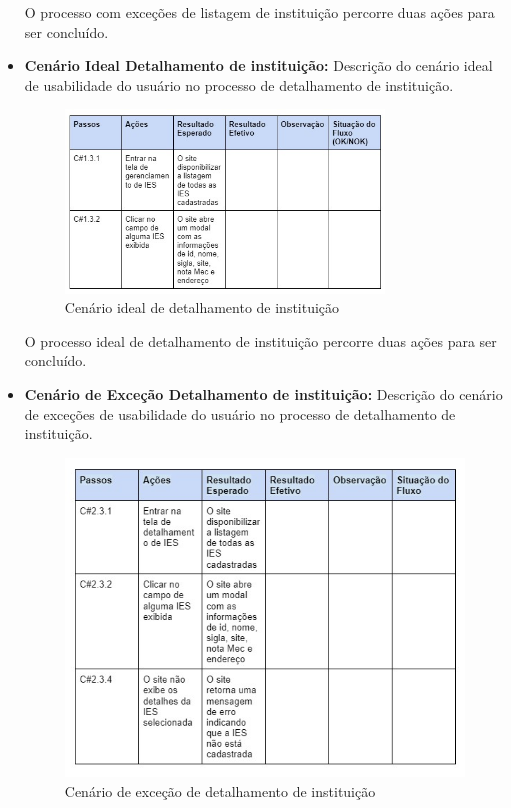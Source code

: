 \begin{itemize}
O processo com exceções de listagem de instituição percorre duas ações para ser concluído.

\newpage
     
     \item \textbf{Cenário Ideal Detalhamento de instituição:}
Descrição do cenário ideal de usabilidade do usuário no processo de detalhamento de instituição.

\begin{figure}[ht]
        \centering
\includegraphics[width=0.80\textwidth]{images/teste-det-instituicao-feliz.jpg}
        \caption{Cenário ideal de detalhamento de instituição}
        \label{commitsAturo}
    \end{figure}

O processo ideal de detalhamento de instituição percorre duas ações para ser concluído.

\newpage

     \item \textbf{Cenário de Exceção Detalhamento de instituição:}
Descrição do cenário de exceções de usabilidade do usuário no processo de detalhamento de instituição.

\begin{figure}[ht]
        \centering
\includegraphics[width=1.0\textwidth]{images/teste-det-instituicao-excecao.jpg}
        \caption{Cenário de exceção de detalhamento de instituição}
        \label{commitsAturo}
    \end{figure}


\end{itemize}
